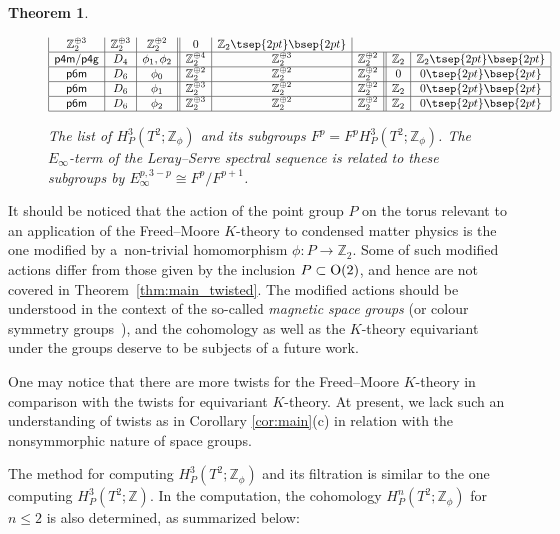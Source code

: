 \documentclass[pdftex]{sigma}
\newtheorem{thm}{Theorem}[section]
\theoremstyle{definition}
\newcommand{\Z}{\mathbb{Z}}
\begin{document}
\begin{thm}
\begin{figure}[htpb]
$$\begin{array}{|c|c|c||c|c|c||c|c|}
\Z_2^{\oplus 3} & \Z_2^{\oplus 3} & \Z_2^{\oplus 2} &
0 & \Z_2 \tsep{2pt}\bsep{2pt}\\
\hline
\mbox{\textsf{p4m}/\textsf{p4g}} & D_4 & \phi_1, \phi_2 &
\Z_2^{\oplus 4} & \Z_2^{\oplus 3} & \Z_2^{\oplus 2} &
\Z_2 & \Z_2 \tsep{2pt}\bsep{2pt}\\
\hline
\mbox{\textsf{p6m}} & D_6 & \phi_0 &
\Z_2^{\oplus 2} & \Z_2^{\oplus 2} & \Z_2^{\oplus 2} &
0 & 0 \tsep{2pt}\bsep{2pt}\\
\hline
\mbox{\textsf{p6m}} & D_6 & \phi_1 &
\Z_2^{\oplus 3} & \Z_2^{\oplus 2} & \Z_2^{\oplus 2} &
\Z_2 & 0 \tsep{2pt}\bsep{2pt}\\
\hline
\mbox{\textsf{p6m}} & D_6 & \phi_2 &
\Z_2^{\oplus 3} & \Z_2^{\oplus 2} & \Z_2^{\oplus 2} &
\Z_2 & 0 \tsep{2pt}\bsep{2pt}\\
\hline
\end{array}
$$
\caption{The list of $H^3_P(T^2; \Z_\phi)$ and its subgroups $F^p = F^pH^3_P(T^2; \Z_\phi)$. The $E_\infty$-term of the Leray--Serre spectral sequence is related to these subgroups by $E^{p, 3-p}_\infty \cong F^p/F^{p+1}$.}
\label{fig:list_twisted}
\end{figure}
\end{thm}

It should be noticed that the action of the point group $P$ on the torus relevant to an application of the Freed--Moore $K$-theory to condensed matter physics is the one modif\/ied by a~non-trivial homomorphism $\phi\colon P \to \Z_2$. Some of such modif\/ied actions dif\/fer from those given by the inclusion $P \subset {\rm O}(2)$, and hence are not covered in Theorem~\ref{thm:main_twisted}. The modif\/ied actions should be understood in the context of the so-called \textit{magnetic space groups} (or colour symmetry groups~\cite{Sch2}), and the cohomology as well as the $K$-theory equivariant under the groups deserve to be subjects of a future work.

One may notice that there are more twists for the Freed--Moore $K$-theory in comparison with the twists for equivariant $K$-theory. At present, we lack such an understanding of twists as in Corollary \ref{cor:main}(c) in relation with the nonsymmorphic nature of space groups.

The method for computing $H^3_P(T^2; \Z_\phi)$ and its f\/iltration is similar to the one computing $H^3_P(T^2; \Z)$. In the computation, the cohomology $H^n_P(T^2; \Z_\phi)$ for $n \le 2$ is also determined, as summarized below:
\end{document}
